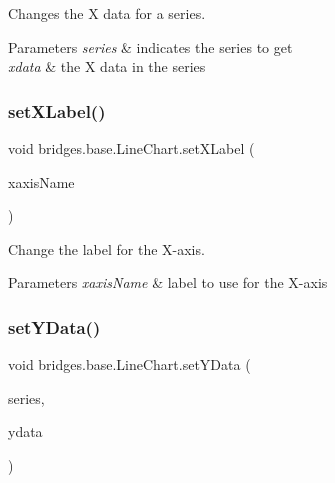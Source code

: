 Changes the X data for a series. 


\begin{DoxyParams}{Parameters}
{\em series} & indicates the series to get \\
\hline
{\em xdata} & the X data in the series \\
\hline
\end{DoxyParams}
\mbox{\label{classbridges_1_1base_1_1_line_chart_ab402a1134bb79919860368a234f62ea2}} 
\subsubsection{\texorpdfstring{set\+X\+Label()}{setXLabel()}}
{\footnotesize\ttfamily void bridges.\+base.\+Line\+Chart.\+set\+X\+Label (\begin{DoxyParamCaption}\item[{String}]{xaxis\+Name }\end{DoxyParamCaption})}



Change the label for the X-\/axis. 


\begin{DoxyParams}{Parameters}
{\em xaxis\+Name} & label to use for the X-\/axis \\
\hline
\end{DoxyParams}
\mbox{\label{classbridges_1_1base_1_1_line_chart_a3076dc99debb599529169de40815aba2}} 
\subsubsection{\texorpdfstring{set\+Y\+Data()}{setYData()}\hspace{0.1cm}{\footnotesize\ttfamily [1/2]}}
{\footnotesize\ttfamily void bridges.\+base.\+Line\+Chart.\+set\+Y\+Data (\begin{DoxyParamCaption}\item[{String}]{series,  }\item[{Array\+List$<$ Double $>$}]{ydata }\end{DoxyParamCaption})}



